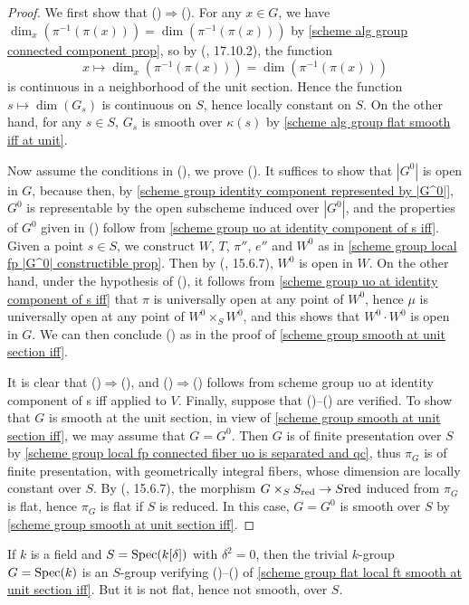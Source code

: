 \begin{proof}
We first show that ()$\Rightarrow$(). For any $x\in G$, we have $\dim_x(\pi^{-1}(\pi(x)))=\dim(\pi^{-1}(\pi(x)))$ by \cref{scheme alg group connected component prop}, so by (\cite{EGA4-4}, 17.10.2), the function
\[x\mapsto\dim_x(\pi^{-1}(\pi(x)))=\dim(\pi^{-1}(\pi(x)))\]
is continuous in a neighborhood of the unit section. Hence the function $s\mapsto\dim(G_s)$ is continuous on $S$, hence locally constant on $S$. On the other hand, for any $s\in S$, $G_s$ is smooth over $\kappa(s)$ by \cref{scheme alg group flat smooth iff at unit}.\par
Now assume the conditions in (), we prove (). It suffices to show that $|G^0|$ is open in $G$, because then, by \cref{scheme group identity component represented by |G^0|}, $G^0$ is representable by the open subscheme induced over $|G^0|$, and the properties of $G^0$ given in () follow from \cref{scheme group uo at identity component of s iff}. Given a point $s\in S$, we construct $W$, $T$, $\pi''$, $e''$ and $W^0$ as in \cref{scheme group local fp |G^0| constructible prop}. Then by (\cite{EGA4-3}, 15.6.7), $W^0$ is open in $W$. On the other hand, under the hypothesis of (), it follows from \cref{scheme group uo at identity component of s iff} that $\pi$ is universally open at any point of $W^0$, hence $\mu$ is universally open at any point of $W^0\times_SW^0$, and this shows that $W^0\cdot W^0$ is open in $G$. We can then conclude () as in the proof of \cref{scheme group smooth at unit section iff}.\par
It is clear that ()$\Rightarrow$(), and ()$\Rightarrow$() follows from {scheme group uo at identity component of s iff} applied to $V$. Finally, suppose that ()--() are verified. To show that $G$ is smooth at the unit section, in view of \cref{scheme group smooth at unit section iff}, we may assume that $G=G^0$. Then $G$ is of finite presentation over $S$ by \cref{scheme group local fp connected fiber uo is separated and qc}, thus $\pi_G$ is of finite presentation, with geometrically integral fibers, whose dimension are locally constant over $S$. By (\cite{EGA4-3}, 15.6.7), the morphism $G\times_SS_{\mathrm{red}}\to S{\mathrm{red}}$ induced from $\pi_G$ is flat, hence $\pi_G$ is flat if $S$ is reduced. In this case, $G=G^0$ is smooth over $S$ by \cref{scheme group smooth at unit section iff}.
\end{proof}

\begin{example}\label{scheme group fiber smooth nonsmooth example}
If $k$ is a field and $S=\mathrm{Spec}(k[\delta])$ with $\delta^2=0$, then the trivial $k$-group $G=\mathrm{Spec}(k)$ is an $S$-group verifying ()--() of \cref{scheme group flat local ft smooth at unit section iff}. But it is not flat, hence not smooth, over $S$. 
\end{example}

